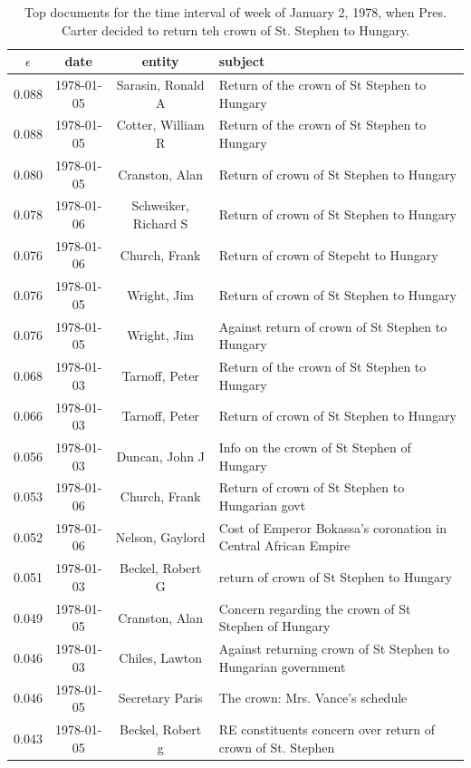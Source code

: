 \begin{table}[tb]
\small
\centering
\begin{tabular}{cccl}
\toprule
$\epsilon$ & date & entity & subject \\
\midrule
0.088 & 1978-01-05 & Sarasin, Ronald A & Return of the crown of St Stephen to Hungary \\
0.088 & 1978-01-05 & Cotter, William R & Return of the crown of St Stephen to Hungary \\
0.080 & 1978-01-05 & Cranston, Alan & Return of crown of St Stephen to Hungary \\
0.078 & 1978-01-06 & Schweiker, Richard S & Return of crown of St Stephen to Hungary \\
0.076 &  1978-01-06 & Church, Frank & Return of crown of Stepeht to Hungary \\
0.076 &  1978-01-05 & Wright, Jim & Return of crown of St Stephen to Hungary \\
0.076 &  1978-01-05 & Wright, Jim & Against return of crown of St Stephen to Hungary \\
0.068 &  1978-01-03 & Tarnoff, Peter & Return of the crown of St Stephen to Hungary \\
0.066 & 1978-01-03 & Tarnoff, Peter & Return of crown of St Stephen to Hungary \\
0.056 &  1978-01-03 & Duncan, John J & Info on the crown of St Stephen of Hungary \\
0.053 &  1978-01-06 & Church, Frank & Return of crown of St Stephen to Hungarian govt \\
0.052 &  1978-01-06 & Nelson, Gaylord & Cost of Emperor Bokassa's coronation in Central African Empire \\
0.051 &  1978-01-03 & Beckel, Robert G & return of crown of St Stephen to Hungary \\
0.049 &  1978-01-05 & Cranston, Alan & Concern regarding the crown of St Stephen of Hungary \\
0.046 &  1978-01-03 & Chiles, Lawton & Against returning crown of St Stephen to Hungarian government \\
0.046 &  1978-01-05 & Secretary Paris & The crown: Mrs. Vance's schedule \\
0.043 &  1978-01-05 & Beckel, Robert g & RE constituents concern over return of crown of St. Stephen \\
\bottomrule
\end{tabular}
\label{tab:crown}
\caption{Top documents for the time interval of week of January 2, 1978, when Pres. Carter decided to return teh crown of St. Stephen to Hungary.}
\end{table}


